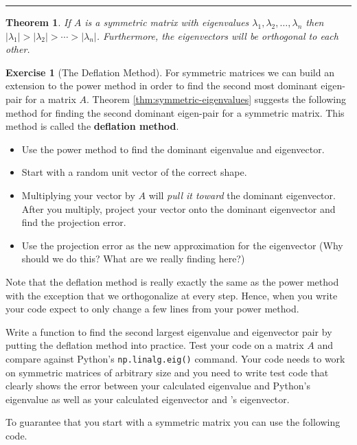\documentclass[
]{book}
\providecommand{\tightlist}{%
  \setlength{\itemsep}{0pt}\setlength{\parskip}{0pt}}
\newtheorem{theorem}{Theorem}[chapter]
\theoremstyle{definition}
\theoremstyle{definition}
\theoremstyle{definition}
\newtheorem{exercise}{Exercise}[chapter]
\theoremstyle{remark}
\begin{document}
\begin{center}\rule{0.5\linewidth}{0.5pt}\end{center}

\begin{theorem}
\protect\hypertarget{thm:symmetric-eigenvalues}{}{\label{thm:symmetric-eigenvalues} }If \(A\) is a symmetric matrix with eigenvalues \(\lambda_1, \lambda_2, \ldots, \lambda_n\) then \(|\lambda_1| > |\lambda_2| > \cdots > |\lambda_n|\). Furthermore, the eigenvectors will be orthogonal to each other.
\end{theorem}

\begin{exercise}[The Deflation Method]
\protect\hypertarget{exr:unnamed-chunk-397}{}{\label{exr:unnamed-chunk-397} {} }
For symmetric matrices we can build an extension to the power method in order to find the second most dominant eigen-pair for a matrix \(A\). Theorem \ref{thm:symmetric-eigenvalues} suggests the following method for finding the second dominant eigen-pair for a symmetric matrix. This method is called the \textbf{deflation method}.

\begin{itemize}
\tightlist
\item
  Use the power method to find the dominant eigenvalue and eigenvector.
\item
  Start with a random unit vector of the correct shape.
\item
  Multiplying your vector by \(A\) will \emph{pull it toward} the dominant eigenvector. After you multiply, project your vector onto the dominant eigenvector and find the projection error.
\item
  Use the projection error as the new approximation for the eigenvector (Why should we do this? What are we really finding here?)
\end{itemize}

Note that the deflation method is really exactly the same as the power method with the exception that we orthogonalize at every step. Hence, when you write your code expect to only change a few lines from your power method.

Write a function to find the second largest eigenvalue and eigenvector pair by putting the deflation method into practice. Test your code on a matrix \(A\) and compare against Python's \texttt{np.linalg.eig()} command. Your code needs to work on symmetric matrices of arbitrary size and you need to write test code that clearly shows the error between your calculated eigenvalue and Python's eigenvalue as well as your calculated eigenvector and 's eigenvector.

To guarantee that you start with a symmetric matrix you can use the
following code.
\end{exercise}
\end{document}
